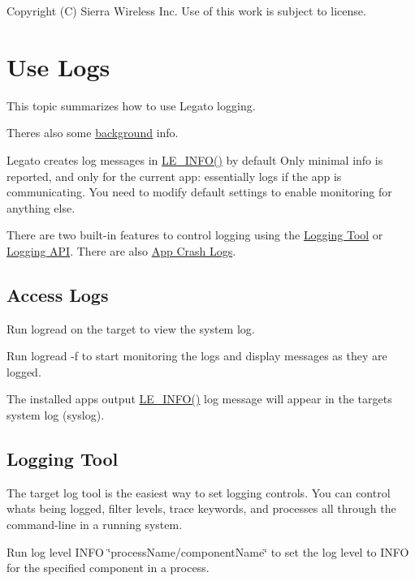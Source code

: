 Copyright (C) Sierra Wireless Inc. Use of this work is subject to license. \hypertarget{howToLogs}{}\section{Use Logs}\label{howToLogs}
This topic summarizes how to use Legato logging.

There\textquotesingle{}s also some \hyperlink{basicLog}{background} info.





Legato creates log messages in \hyperlink{le__log_8h_a23e6d206faa64f612045d688cdde5808}{L\+E\+\_\+\+I\+N\+F\+O()} by default Only minimal info is reported, and only for the current app\+: essentially logs if the app is communicating. You need to modify default settings to enable monitoring for anything else.

There are two built-\/in features to control logging using the \hyperlink{how_to_logs_howToLogs_tool}{Logging Tool} or \hyperlink{how_to_logs_howToLogs_api}{Logging A\+P\+I}. There are also \hyperlink{c_logging_c_log_debugFiles}{App Crash Logs}.\hypertarget{how_to_logs_howToLogs_run}{}\subsection{Access Logs}\label{how_to_logs_howToLogs_run}
Run {\ttfamily logread} on the target to view the system log.

Run {\ttfamily logread -\/f } to start monitoring the logs and display messages as they are logged.

The installed app\textquotesingle{}s output \hyperlink{le__log_8h_a23e6d206faa64f612045d688cdde5808}{L\+E\+\_\+\+I\+N\+F\+O()} log message will appear in the target\textquotesingle{}s system log (syslog).\hypertarget{how_to_logs_howToLogs_tool}{}\subsection{Logging Tool}\label{how_to_logs_howToLogs_tool}
The target {\ttfamily log} tool is the easiest way to set logging controls. You can control what\textquotesingle{}s being logged, filter levels, trace keywords, and processes all through the command-\/line in a running system.

Run {\ttfamily log level I\+N\+F\+O \char`\"{}process\+Name/component\+Name\char`\"{}} to set the log level to I\+N\+F\+O for the specified component in a process.

